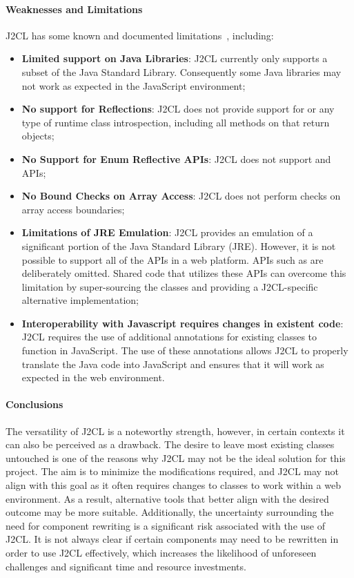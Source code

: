 \paragraph{Weaknesses and Limitations} J2CL has some known and documented limitations~\cite{j2cllimi50:online}, including:
\begin{itemize}
	\item \textbf{Limited support on Java Libraries}: J2CL currently only supports a subset of the Java Standard Library. Consequently some Java libraries may not work as expected in the JavaScript environment;
	\item \textbf{No support for Reflections}: J2CL does not provide support for  or any type of runtime class introspection, including all methods on  that return  objects;
	\item \textbf{No Support for Enum Reflective APIs}: J2CL does not support  and  APIs;
	\item \textbf{No Bound Checks on Array Access}: J2CL does not perform checks on array access boundaries;
	\item \textbf{Limitations of JRE Emulation}: J2CL provides an emulation of a significant portion of the Java Standard Library (JRE). However, it is not possible to support all of the APIs in a web platform. APIs such as  are deliberately omitted. Shared code that utilizes these APIs can overcome this limitation by super-sourcing the classes and providing a J2CL-specific alternative implementation;
	\item \textbf{Interoperability with Javascript requires changes in existent code}: J2CL requires the use of additional annotations for existing classes to function in JavaScript. The use of these annotations allows J2CL to properly translate the Java code into JavaScript and ensures that it will work as expected in the web environment.
\end{itemize}

\paragraph{Conclusions} The versatility of J2CL is a noteworthy strength, however, in certain contexts it can also be perceived as a drawback. The desire to leave most existing classes untouched is one of the reasons why J2CL may not be the ideal solution for this project. The aim is to minimize the modifications required, and J2CL may not align with this goal as it often requires changes to classes to work within a web environment. As a result, alternative tools that better align with the desired outcome may be more suitable. Additionally, the uncertainty surrounding the need for component rewriting is a significant risk associated with the use of J2CL. It is not always clear if certain components may need to be rewritten in order to use J2CL effectively, which increases the likelihood of unforeseen challenges and significant time and resource investments.
